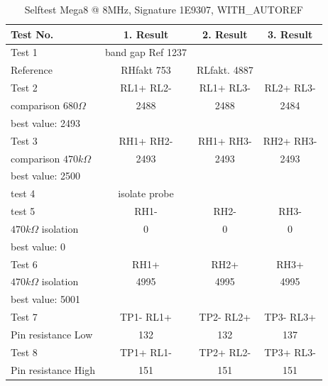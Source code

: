 \begin{table}[H]
  \begin{center}
    \begin{tabular}{| l | c | c | c |}
    \hline
Test No. & 1. Result & 2. Result & 3. Result \\
    \hline
    \hline
Test 1 & band gap Ref  1237 &  & \\
Reference  & RHfakt 753 & RLfakt.  4887 &  \\
    \hline
Test 2 & RL1+ RL2- & RL1+ RL3- & RL2+ RL3- \\
comparison \(680\Omega\) & 2488 & 2488 & 2484 \\
best value: 2493 & & & \\
    \hline
Test 3 & RH1+ RH2- & RH1+ RH3- & RH2+ RH3- \\
comparison \(470k\Omega\) & 2493 & 2493 & 2493 \\
best value: 2500 & & & \\
    \hline
test 4 & isolate probe & & \\
    \hline
test 5 & RH1- &  RH2- & RH3- \\
\(470k\Omega\) isolation & 0 & 0 & 0 \\
best value: 0 & & & \\
    \hline
Test 6 & RH1+ & RH2+ & RH3+ \\
\(470k\Omega\) isolation & 4995 & 4995 & 4995 \\
best value: 5001 & & & \\
    \hline
Test 7 & TP1- RL1+ & TP2- RL2+ & TP3- RL3+ \\
Pin resistance Low & 132 & 132 & 137 \\
    \hline
Test 8 & TP1+ RL1- & TP2+ RL2- & TP3+ RL3- \\
Pin resistance High & 151 & 151 & 151 \\
    \hline
    \end{tabular}
  \end{center}
  \caption{Selftest Mega8 @ 8MHz, Signature 1E9307, WITH\_AUTOREF}
  \label{tab:test_m8} 
\end{table}


